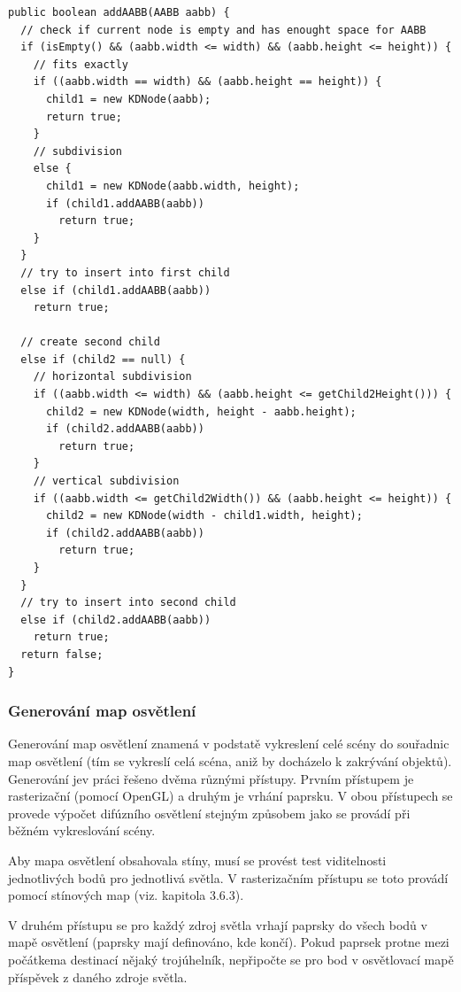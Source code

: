 \documentclass[11pt,twoside,a4paper]{book}
\begin{document}
\lstset{language=Java} 
\begin{lstlisting}[caption=Vkládání AABB do kD stromu za využití rekurze]
public boolean addAABB(AABB aabb) {
  // check if current node is empty and has enought space for AABB
  if (isEmpty() && (aabb.width <= width) && (aabb.height <= height)) {
    // fits exactly
    if ((aabb.width == width) && (aabb.height == height)) {
      child1 = new KDNode(aabb);
      return true;
    }         
    // subdivision
    else {
      child1 = new KDNode(aabb.width, height);
      if (child1.addAABB(aabb))
        return true;
    }
  }     
  // try to insert into first child
  else if (child1.addAABB(aabb))
    return true;

  // create second child
  else if (child2 == null) {    
    // horizontal subdivision
    if ((aabb.width <= width) && (aabb.height <= getChild2Height())) {
      child2 = new KDNode(width, height - aabb.height);
      if (child2.addAABB(aabb))
        return true;
    }      
    // vertical subdivision
    if ((aabb.width <= getChild2Width()) && (aabb.height <= height)) {
      child2 = new KDNode(width - child1.width, height);
      if (child2.addAABB(aabb))
        return true;
    }
  }     
  // try to insert into second child
  else if (child2.addAABB(aabb))
    return true;
  return false;
}
\end{lstlisting}

\subsubsection{Generování map osvětlení}
Generování map osvětlení znamená v podstatě vykreslení celé scény do souřadnic map osvětlení (tím se vykreslí celá scéna, aniž by docházelo k zakrývání objektů). Generování je\linebreak v práci řešeno dvěma různými přístupy. Prvním přístupem je rasterizační (pomocí OpenGL) a druhým je vrhání paprsku. V obou přístupech se provede výpočet difúzního osvětlení stejným způsobem jako se provádí při běžném vykreslování scény. 

Aby mapa osvětlení obsahovala stíny, musí se provést test viditelnosti jednotlivých bodů pro jednotlivá světla. V rasterizačním přístupu se toto provádí pomocí stínových map (viz. kapitola 3.6.3).

V druhém přístupu se pro každý zdroj světla vrhají paprsky do všech bodů v mapě osvětlení (paprsky mají definováno, kde končí). Pokud paprsek protne mezi počátkem\linebreak a destinací nějaký trojúhelník, nepřipočte se pro bod v osvětlovací mapě příspěvek z daného zdroje světla.
\end{document}
